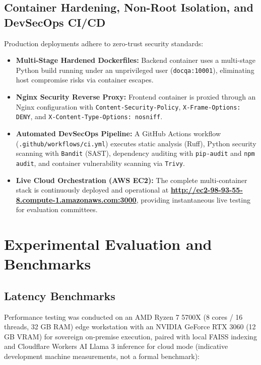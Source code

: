 \documentclass[12pt,a4paper,oneside]{report}
\begin{document}
\section{Container Hardening, Non-Root Isolation, and DevSecOps CI/CD}
Production deployments adhere to zero-trust security standards:
\begin{itemize}[itemsep=2pt]
    \item \textbf{Multi-Stage Hardened Dockerfiles:} Backend container uses a multi-stage Python build running under an unprivileged user (\texttt{docqa:10001}), eliminating host compromise risks via container escapes.
    \item \textbf{Nginx Security Reverse Proxy:} Frontend container is proxied through an Nginx configuration with \texttt{Content-Security-Policy}, \texttt{X-Frame-Options: DENY}, and \texttt{X-Content-Type-Options: nosniff}.
    \item \textbf{Automated DevSecOps Pipeline:} A GitHub Actions workflow (\texttt{.github/workflows/ci.yml}) executes static analysis (Ruff), Python security scanning with \texttt{Bandit} (SAST), dependency auditing with \texttt{pip-audit} and \texttt{npm audit}, and container vulnerability scanning via \texttt{Trivy}.
    \item \textbf{Live Cloud Orchestration (AWS EC2):} The complete multi-container stack is continuously deployed and operational at \href{http://ec2-98-93-55-8.compute-1.amazonaws.com:3000}{\textbf{\color{linkblue}http://ec2-98-93-55-8.compute-1.amazonaws.com:3000}}, providing instantaneous live testing for evaluation committees.
\end{itemize}

\newpage

\chapter{Experimental Evaluation and Benchmarks}

\section{Latency Benchmarks}
Performance testing was conducted on an AMD Ryzen 7 5700X (8 cores / 16 threads, 32 GB RAM) edge workstation with an NVIDIA GeForce RTX 3060 (12 GB VRAM) for sovereign on-premise execution, paired with local FAISS indexing and Cloudflare Workers AI Llama 3 inference for cloud mode (indicative development machine measurements, not a formal benchmark):
\end{document}
